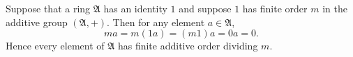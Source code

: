 Suppose that a ring $\mathfrak{A}$ has an identity $1$ and suppose $1$ has finite order $m$ in the additive group $(\mathfrak{A}, +)$. Then for any element $a \in \mathfrak{A}$,
$$ma = m(1a) = (m1)a = 0a = 0.$$
Hence every element of $\mathfrak{A}$ has finite additive order dividing $m$.
